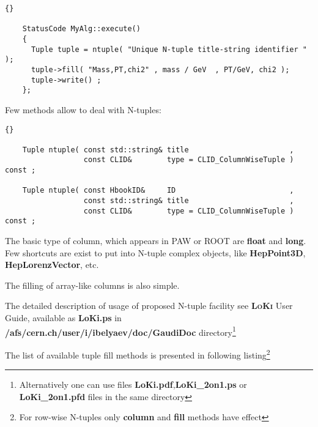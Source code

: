 \documentclass{lhcbnote}
\newcommand{\bftt}         {\ttfamily\bfseries}
\newcommand{\scbf}         {\scshape\bfseries}
\begin{document}
\begin{scriptsize}
  \begin{lstlisting}{}

    StatusCode MyAlg::execute()
    {
      Tuple tuple = ntuple( "Unique N-tuple title-string identifier " );
      tuple->fill( "Mass,PT,chi2" , mass / GeV  , PT/GeV, chi2 );
      tuple->write() ;
    };

  \end{lstlisting}
\end{scriptsize}
Few methods allow to deal with N-tuples:

\begin{scriptsize}
  \begin{lstlisting}{}

    Tuple ntuple( const std::string& title                       ,
                  const CLID&        type = CLID_ColumnWiseTuple ) const ;

    Tuple ntuple( const HbookID&     ID                          ,
                  const std::string& title                       ,
                  const CLID&        type = CLID_ColumnWiseTuple ) const ;

  \end{lstlisting}
\end{scriptsize}

The basic type of column, which appears in PAW or ROOT
are {\bftt{float}} and {\bftt{long}}. Few shortcuts are exist
to put into N-tuple complex objects, like {\bftt{HepPoint3D}},
{\bftt{HepLorenzVector}}, etc.

The filling of array-like columns is also simple.

The detailed description of usage of proposed N-tuple facility see
{\scbf{LoKi}} User Guide, available as
{\bftt{LoKi.ps}} in
{\bftt{/afs/cern.ch/user/i/ibelyaev/doc/GaudiDoc}} directory\footnote{
Alternatively one can use files {\bftt{LoKi.pdf}},{\bftt{LoKi\_2on1.ps}}
or {\bftt{LoKi\_2on1.pfd}} files in the same directory}

The list of available tuple fill methods
is presented in following listing\footnote{For
row-wise N-tuples only {\bftt{column}} and
{\bftt{fill}} methods have effect}
\end{document}
